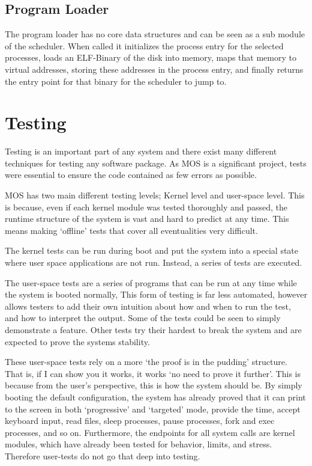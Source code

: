 \documentclass[a4paper]{report}
\begin{document}
\section{Program Loader}

The program loader has no core data structures and can be seen as a sub module of the scheduler. When called it initializes the process entry for the selected processes, loads an ELF-Binary of the disk into memory, maps that memory to virtual addresses, storing these addresses in the process entry, and finally returns the entry point for that binary for the scheduler to jump to.








\chapter{Testing}

Testing is an important part of any system and there exist many different techniques for testing any software package. As MOS is a significant project, tests were essential to ensure the code contained as few errors as possible.

MOS has two main different testing levels; Kernel level and user-space level. This is because, even if each kernel module was tested thoroughly and passed, the runtime structure of the system is vast and hard to predict at any time. This means making `offline' tests that cover all eventualities very difficult.

The kernel tests can be run during boot and put the system into a special state where user space applications are not run. Instead, a series of tests are executed.

The user-space tests are a series of programs that can be run at any time while the system is booted normally, This form of testing is far less automated, however allows testers to add their own intuition about how and when to run the test, and how to interpret the output. Some of the tests could be seen to simply demonstrate a feature. Other tests try their hardest to break the system and are expected to prove the systems stability.

These user-space tests rely on a more `the proof is in the pudding' structure. That is, if I can show you it works, it works `no need to prove it further'. This is because from the user's perspective, this is how the system should be. By simply booting the default configuration, the system has already proved that it can print to the screen in both `progressive' and `targeted' mode, provide the time, accept keyboard input, read files, sleep processes, pause processes, fork and exec processes, and so on. Furthermore, the endpoints for all system calls are kernel modules, which have already been tested for behavior, limits, and stress. Therefore user-tests do not go that deep into testing.
\end{document}
